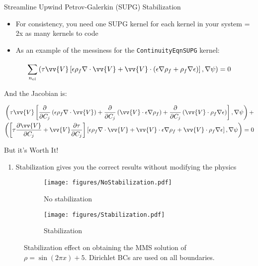 \documentclass{beamer}
\begin{document}

\begin{frame}{Streamline Upwind Petrov-Galerkin (SUPG) Stabilization}

\begin{itemize}
\item For consistency, you need one SUPG kernel for each kernel in your system = 2x as many kernels to code
\item As an example of the messiness for the \texttt{ContinuityEqnSUPG} kernel:
\end{itemize}

\begin{equation}
\sum_{n_{el}}^{}\left(\tau\vv{V}\left\lbrack\epsilon\rho_f\nabla\cdot\vv{V}+\vv{V}\cdot\left(\epsilon\nabla\rho_f+\rho_f\nabla\epsilon\right)\right\rbrack,\nabla\psi\right)=0
\end{equation}

And the Jacobian is:

\begin{equation}
\begin{aligned}
\left(\tau\vv{V}   \left\lbrack\frac{\partial}{\partial C_j}\left(\epsilon\rho_f\nabla\cdot\vv{V}\right)+\frac{\partial}{\partial C_j}\left(\vv{V}\cdot\epsilon\nabla\rho_f\right)+\frac{\partial}{\partial C_j}\left(\vv{V}\cdot\rho_f\nabla\epsilon\right)\right\rbrack,\nabla\psi\right)+\\
  \left(\left\lbrack\tau\frac{\partial\vv{V}}{\partial C_j}+\vv{V}\frac{\partial\tau}{\partial C_j}\right\rbrack\left\lbrack\epsilon\rho_f\nabla\cdot\vv{V}+\vv{V}\cdot\epsilon\nabla\rho_f+\vv{V}\cdot\rho_f\nabla\epsilon\right\rbrack,\nabla\psi\right)=0\\
\end{aligned}
\end{equation}

\end{frame}


\begin{frame}{But it's Worth It!}

\begin{enumerate}
\item Stabilization gives you the correct results without modifying the physics
\end{enumerate}

\begin{figure}[H]
\centering
\begin{subfigure}{.425\textwidth}
  \centering
  \texttt{[image: figures/NoStabilization.pdf]}
  \caption{No stabilization}
\end{subfigure}
\begin{subfigure}{.425\textwidth}
  \centering
  \texttt{[image: figures/Stabilization.pdf]}
  \caption{Stabilization}
\end{subfigure}
\caption{Stabilization effect on obtaining the MMS solution of \(\rho=\sin{(2\pi x)}+5\). Dirichlet BCs are used on all boundaries.}
\end{figure}

\end{frame}
\end{document}

